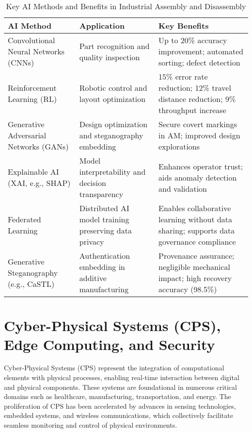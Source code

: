 \documentclass[sigconf]{acmart}
\begin{document}
\begin{table*}[htbp]
\centering
\caption{Key AI Methods and Benefits in Industrial Assembly and Disassembly}
\label{tab:ai_methods_assembly}
\begin{adjustbox}{max width=\textwidth}
\begin{tabular}{@{}lll@{}}
\toprule
\textbf{AI Method} & \textbf{Application} & \textbf{Key Benefits} \\ \midrule
Convolutional Neural Networks (CNNs) & Part recognition and quality inspection & Up to 20\% accuracy improvement; automated sorting; defect detection \\ 
Reinforcement Learning (RL) & Robotic control and layout optimization & 15\% error rate reduction; 12\% travel distance reduction; 9\% throughput increase \\ 
Generative Adversarial Networks (GANs) & Design optimization and steganography embedding & Secure covert markings in AM; improved design explorations \\ 
Explainable AI (XAI, e.g., SHAP) & Model interpretability and decision transparency & Enhances operator trust; aids anomaly detection and validation \\ 
Federated Learning & Distributed AI model training preserving data privacy & Enables collaborative learning without data sharing; supports data governance compliance \\ 
Generative Steganography (e.g., CaSTL) & Authentication embedding in additive manufacturing & Provenance assurance; negligible mechanical impact; high recovery accuracy (98.5\%) \\ \bottomrule
\end{tabular}
\end{adjustbox}
\end{table*}

\section{Cyber-Physical Systems (CPS), Edge Computing, and Security}

Cyber-Physical Systems (CPS) represent the integration of computational elements with physical processes, enabling real-time interaction between digital and physical components. These systems are foundational in numerous critical domains such as healthcare, manufacturing, transportation, and energy. The proliferation of CPS has been accelerated by advances in sensing technologies, embedded systems, and wireless communications, which collectively facilitate seamless monitoring and control of physical environments.
\end{document}
